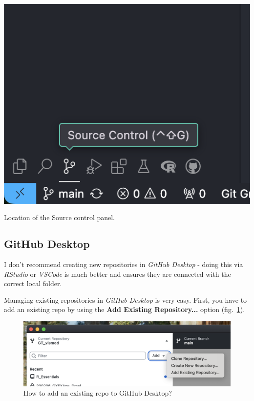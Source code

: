 \documentclass{tufte-handout}
\begin{document}
\begin{marginfigure}
    \includegraphics{Zrzut ekranu 2024-12-20 o 14.14.45.png}
    \caption{Location of the Source control panel.}
    \label{fig:source-control}
\end{marginfigure}

\subsection{GitHub Desktop}

I don't recommend creating new repositories in \textit{GitHub Desktop} - doing this via \textit{RStudio} or \textit{VSCode} is much better and ensures they are connected with the correct local folder.

Managing existing repositories in \textit{GitHub Desktop} is very easy. First, you have to add an existing repo by using the \textbf{Add Existing Repository...} option (fig.~\ref{fig:ghd-add}).

\begin{figure}
    \includegraphics[width=1\linewidth]{Zrzut ekranu 2024-12-20 o 14.23.07.png}
    \caption{How to add an existing repo to GitHub Desktop?}
    \label{fig:ghd-add}
\end{figure}
\end{document}
